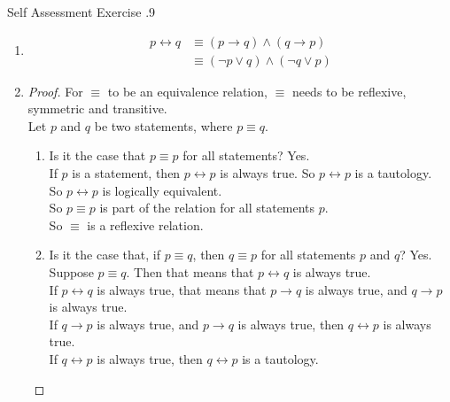 \documentclass[\main/notes.tex]{subfiles}
\begin{document}
			\pagebreak
			\begin{exercise}{Self Assessment Exercise \thechapter.9}
				\begin{enumerate}
					\item {}
						\begin{align*}
							p \leftrightarrow q &\equiv (p \rightarrow q) \land (q \rightarrow p)\\
							&\equiv (\lnot p \lor q) \land (\lnot q \lor p)
						\end{align*}
					\item {}
						\begin{proof}
							For $\equiv$ to be an equivalence relation, $\equiv$ needs to be reflexive, symmetric and transitive.\\
							Let $p$ and $q$ be two statements, where $p \equiv q$.
							\begin{enumerate}[label=(\roman*)]
								\item
									\begin{subproof}[Reflexivity]
										Is it the case that $p \equiv p$ for all statements? Yes.\\
										If $p$ is a statement, then $p \leftrightarrow p$ is always true. So $p \leftrightarrow p$ is a tautology.\\
										So $p \leftrightarrow p$ is logically equivalent.\\
										So $p \equiv p$ is part of the relation for all statements $p$.\\
										So $\equiv$ is a reflexive relation.
									\end{subproof}
								\item
									\begin{subproof}[Symmetry]
										Is it the case that, if $p \equiv q$, then $q \equiv p$ for all statements $p$ and $q$? Yes.\\
										Suppose $p \equiv q$. Then that means that $p \leftrightarrow q$ is always true.\\
										If $p \leftrightarrow q$ is always true, that means that $p \rightarrow q$ is always true, and $q \rightarrow p$ is always true.\\
										If $q \rightarrow p$ is always true, and $p \rightarrow q$ is always true, then $q \leftrightarrow p$ is always true.\\
										If $q \leftrightarrow p$ is always true, then $q \leftrightarrow p$ is a tautology.\\

\end{subproof}
\end{enumerate}
\end{proof}
\end{enumerate}
\end{exercise}
\end{document}
